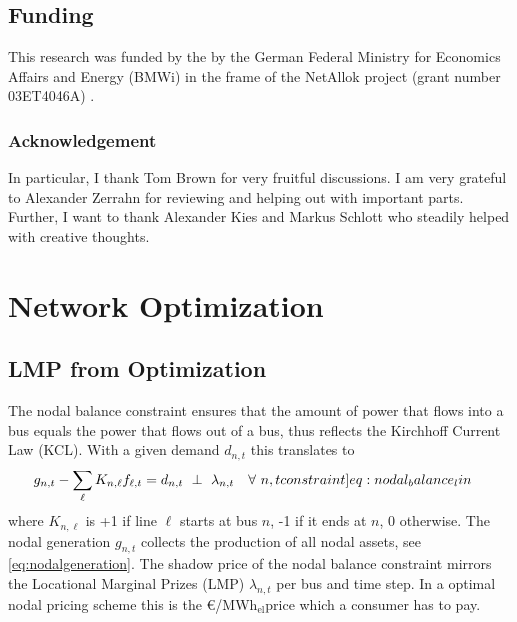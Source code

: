 \documentclass[11pt,twocolumn]{article}
\newcommand{\resultsin}[1]{\hspace{6pt} \bot  \hspace{6pt} #1}
\newcommand{\Forall}[1]{\hspace{10pt} \forall \,\, #1 }
\newcommand{\nodalgeneration}[1][n]{g_{#1,t}}
\newcommand{\flow}{f_{\ell,t}}
\newcommand{\lmp}[1][n]{\lambda_{#1,t}}
\newcommand{\demand}[1][n]{d_{#1,t}}
\newcommand{\nodaldemand}[1][n]{d_{#1,t}}
\newcommand{\incidence}[1][n]{K_{#1,\ell}}
\newcommand{\megawatthour}{MWh$_\text{el}$}
\begin{document}
\subsection*{Funding}
This research was funded by the by the German Federal Ministry for Economics Affairs and Energy (BMWi) in
the frame of the NetAllok project (grant number 03ET4046A) \cite{bundesministerium_fur_wirtschaft_und_energie_verbundvorhaben_nodate}. 

\subsubsection*{Acknowledgement}

In particular, I thank Tom Brown for very fruitful discussions. I am very grateful to Alexander Zerrahn for reviewing and helping out with important parts. Further, I want to thank Alexander Kies and Markus Schlott who steadily helped with creative thoughts.




\clearpage
\appendix

\section{Network Optimization}

\renewcommand\theequation{\thesection.\arabic{equation}}
\setcounter{equation}{0}

\renewcommand\thefigure{\thesection.\arabic{figure}}    
\setcounter{figure}{0}    

\subsection{LMP from Optimization}
\label{sec:lmp}
The nodal balance constraint ensures that the amount of power that flows into a bus equals the power that flows out of a bus, thus reflects the Kirchhoff Current Law (KCL). With a given demand $\demand$ this translates to   
\begin{align}
    \nodalgeneration - \sum_\ell \incidence \flow  &=  \demand 
     \resultsin{\lmp} \Forall{n,t}
    \label[constraint]{eq:nodal_balance_lin}
\end{align}
where $\incidence$ is +1 if line $\ell$ starts at bus $n$, -1 if it ends at $n$, 0 otherwise. The nodal generation $\nodalgeneration$ collects the production of all nodal assets, see \cref{eq:nodalgeneration}. The shadow price of the nodal balance constraint mirrors the Locational Marginal Prizes (LMP) $\lmp$ per bus and time step. In a optimal nodal pricing scheme this is the \euro/\megawatthour price which a consumer has to pay.\\
\end{document}

